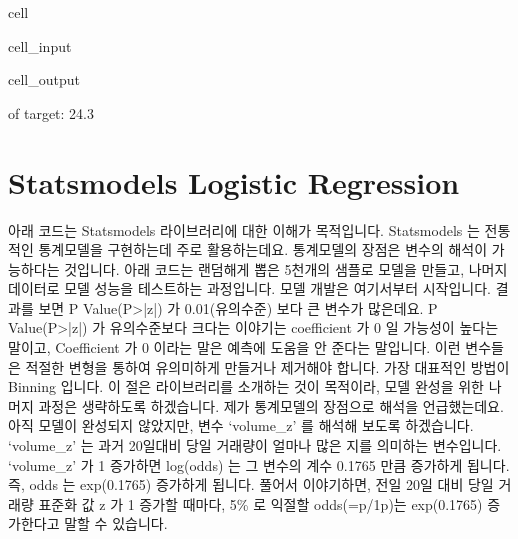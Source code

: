 \documentclass[letterpaper,10pt,english]{jupyterBook}
\begin{document}
\begin{sphinxuseclass}{cell}
\begin{sphinxVerbatimInput}
\begin{sphinxuseclass}{cell_input}
\end{sphinxuseclass}\end{sphinxVerbatimInput}
\begin{sphinxVerbatimOutput}

\begin{sphinxuseclass}{cell_output}
\begin{sphinxVerbatim}[commandchars=\\\{\}]
\PYGZpc{} of target: 24.3\PYGZpc{}
\end{sphinxVerbatim}

\end{sphinxuseclass}\end{sphinxVerbatimOutput}

\end{sphinxuseclass}

\part{Statsmodels \sphinxhyphen{} Logistic Regression}
\label{\detokenize{chapter5/5.2.2_Modeling_Library:statsmodels-logistic-regression}}
\sphinxAtStartPar
아래 코드는 Statsmodels 라이브러리에 대한 이해가 목적입니다. Statsmodels 는 전통적인 통계모델을 구현하는데 주로 활용하는데요. 통계모델의 장점은 변수의 해석이 가능하다는 것입니다. 아래 코드는 랜덤해게 뽑은 5천개의 샘플로 모델을 만들고, 나머지 데이터로 모델 성능을 테스트하는 과정입니다. 모델 개발은 여기서부터 시작입니다.  결과를 보면 P Value(P>|z|) 가 0.01(유의수준) 보다 큰 변수가 많은데요. P Value(P>|z|) 가 유의수준보다 크다는 이야기는 coefficient 가 0 일 가능성이 높다는 말이고, Coefficient 가 0 이라는 말은 예측에 도움을 안 준다는 말입니다. 이런 변수들은 적절한 변형을 통하여 유의미하게 만들거나 제거해야 합니다. 가장 대표적인 방법이 Binning 입니다. 이 절은 라이브러리를 소개하는 것이 목적이라, 모델 완성을 위한 나머지 과정은 생략하도록 하겠습니다. 제가 통계모델의 장점으로 해석을 언급했는데요. 아직 모델이 완성되지 않았지만, 변수 ‘volume\_z’ 를 해석해 보도록 하겠습니다. ‘volume\_z’ 는 과거 20일대비 당일 거래량이 얼마나 많은 지를 의미하는 변수입니다. ‘volume\_z’ 가 1 증가하면 log(odds) 는 그 변수의 계수 0.1765 만큼 증가하게 됩니다. 즉, odds 는 exp(0.1765) 증가하게 됩니다. 풀어서 이야기하면, 전일 20일 대비 당일 거래량 표준화 값 z 가  1 증가할 때마다, 5\% 로 익절할 odds(=p/1\sphinxhyphen{}p)는 exp(0.1765) 증가한다고 말할 수 있습니다.
\end{document}
